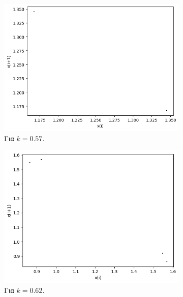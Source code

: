 \begin{figure}[h!]
\begin{subfigure}[b]{0.4\textwidth}
		\includegraphics[width=\textwidth]{LateX images/graphs q09/g5}
		\caption{Για $k=0.57$.}
		\label{f:k50}
	\end{subfigure}
\hfill
	\begin{subfigure}[b]{0.4\textwidth}
		\centering
		\includegraphics[width=\textwidth]{LateX images/graphs q09/g6}
		\caption{Για $k=0.62$.}
		\label{f:k51}
	\end{subfigure}
	\hfill
	\begin{subfigure}[b]{0.4\textwidth}
		\centering

\end{subfigure}
\end{figure}
